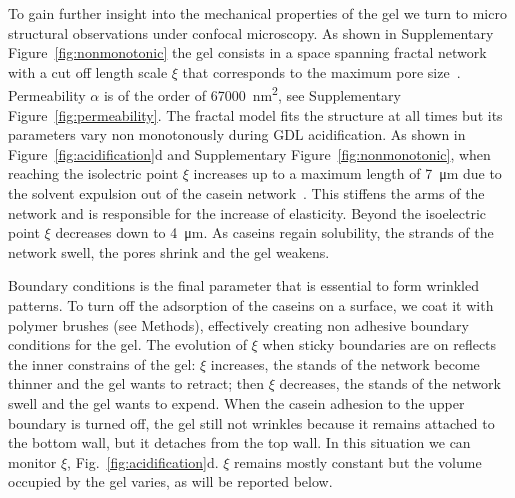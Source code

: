 \documentclass[twocolumn,superscriptaddress,showpacs,preprintnumbers,
amsmath,amssymb,prl]{revtex4-1}
\begin{document}
To gain further insight into the mechanical properties of the gel we turn to micro structural observations under confocal microscopy. As shown in Supplementary Figure~\ref{fig:nonmonotonic} the gel consists in a space spanning fractal network with a cut off length scale $\xi$ that corresponds to the maximum pore size~\cite{VanDijk1986}. Permeability $\alpha$ is of the order of \SI{67000}{\square\nano\metre}, see Supplementary Figure~\ref{fig:permeability}. The fractal model fits the structure at all times but its parameters vary non monotonously during GDL acidification. As shown in Figure~\ref{fig:acidification}d and Supplementary Figure~\ref{fig:nonmonotonic}, when reaching the isolectric point $\xi$ increases up to a maximum length of \SI{7}{\micro\metre} due to the solvent expulsion out of the casein network~\cite{Lucey1998}. This stiffens the arms of the network and is responsible for the increase of elasticity. Beyond the isoelectric point $\xi$ decreases down to \SI{4}{\micro\metre}. As caseins regain solubility, the strands of the network swell, the pores shrink and the gel weakens.


Boundary conditions is the final parameter that is essential to form wrinkled patterns. To turn off the adsorption of the caseins on a surface, we coat it with polymer brushes (see Methods), effectively creating non adhesive boundary conditions for the gel. The evolution of $\xi$ when sticky boundaries are on reflects the inner constrains of the gel: $\xi$ increases, the stands of the network become thinner and the gel wants to retract; then $\xi$ decreases, the stands of the network swell and the gel wants to expend. When the casein adhesion to the upper boundary is turned off, the gel still not wrinkles because it remains attached to the bottom wall, but it detaches from the top wall. In this situation we can monitor $\xi$, Fig.~\ref{fig:acidification}d. $\xi$ remains mostly constant but the volume occupied by the gel varies, as will be reported below.
\end{document}
